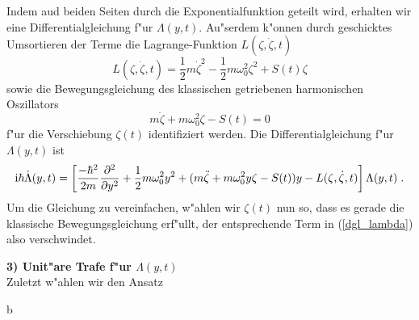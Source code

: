     \newpage

    Indem aud beiden Seiten durch die Exponentialfunktion geteilt wird, erhalten wir eine Differentialgleichung f"ur $\Lambda(y,t)$.
    Au"serdem k"onnen durch geschicktes Umsortieren der Terme die Lagrange-Funktion $L(\zeta,\dot \zeta, t)$
    \begin{equation}
      L(\zeta,\dot \zeta, t) = \frac{1}{2}m\dot \zeta^2 - \frac{1}{2}m\omega_0^2\zeta^2 + S(t)\zeta
    \end{equation}
      sowie die Bewegungsgleichung des klassischen getriebenen harmonischen  Oszillators \cite{husimi}
      \begin{equation}
        m\ddot \zeta + m\omega_0^2\zeta - S(t) = 0
      \end{equation}
    f"ur die Verschiebung $\zeta(t)$ identifiziert werden.
    Die Differentialgleichung f"ur $\Lambda(y,t)$ ist
    \begin{equation}
      \text i \hbar \dot \Lambda(y,t) = \left[ \frac{-\hbar^2}{2m}\frac{\partial^2}{\partial y^2} + \frac{1}{2}m\omega_0^2y^2 + (m\ddot \zeta + m\omega_0^2y\zeta - S(t))y - L(\zeta,\dot \zeta, t) \right]\Lambda(y,t) \; .
      \label{dgl_lambda}
    \end{equation}
    Um die Gleichung zu vereinfachen, w"ahlen wir $\zeta(t)$ nun so, dass es gerade die klassische Bewegungsgleichung erf"ullt, der entsprechende Term in (\ref{dgl_lambda}) also verschwindet.

    \textbf{3) Unit"are Trafe f"ur $\Lambda(y,t)$}\\
    Zuletzt w"ahlen wir den Ansatz





















  b
